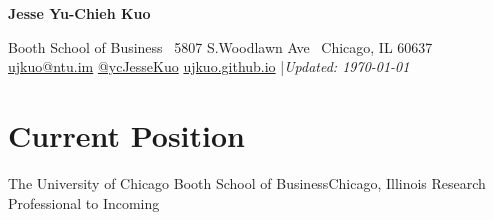 \documentclass{smoothThemeCV}
\newlength{\hvspace}
\begin{document}
\begin{center}
    \noindent\textbf{\LARGE Jesse Yu-Chieh Kuo} \\
\end{center}
\vspace{\hvspace}
\hline
\vspace{\hvspace}
\begin{center}
    \noindent Booth School of Business \textbullet\ 5807 S.\@ Woodlawn Ave \textbullet\ Chicago, IL 60637 \\
    \noindent\faEnvelopeO\enskip \href{mailto:ujkuo@ntu.im}{ujkuo@ntu.im}\enskip
    \faTwitter\enskip\href{https://twitter.com/ycJesseKuo}{@ycJesseKuo}\enskip
    \faGlobe\enskip\href{https://ujkuo.github.io}{ujkuo.github.io}\enskip
    |\enskip \textit{Updated: \today} \\
\end{center}
\vspace{\hvspace}
\hline
\vspace{-10pt}

\section*{Current Position}
\resumeSubHeadingListStart

\resumeSubheading
{The University of Chicago Booth School of Business}{Chicago, Illinois}
{Research Professional to }
{Incoming}

\resumeSubHeadingListEnd












\end{document}

